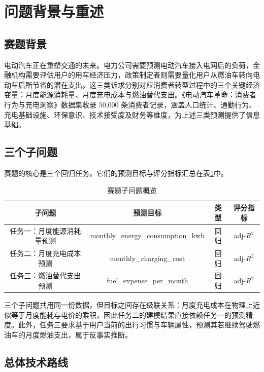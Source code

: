 \section{问题背景与重述}

\subsection{赛题背景}

电动汽车正在重塑交通的未来。电力公司需要预测电动汽车接入电网后的负荷，金融机构需要评估用户的用车经济压力，政策制定者则需要量化用户从燃油车转向电动车后所节省的潜在支出。这三类诉求分别对应消费者转型过程中的三个关键经济变量：月度能源消耗量、月度充电成本与燃油替代支出。《电动汽车革命：消费者行为与充电洞察》数据集收录 50,000 条消费者记录，涵盖人口统计、通勤行为、充电基础设施、环保意识、技术接受度及财务等维度，为上述三类预测提供了信息基础。

\subsection{三个子问题}

赛题的核心是三个回归任务。它们的预测目标与评分指标汇总在表\ref{tab:tasks}中。

\begin{table}[H]
\centering
\caption{赛题子问题概览}
\label{tab:tasks}
\begin{tabular}{cccc}
\toprule
\textbf{子问题} & \textbf{预测目标} & \textbf{类型} & \textbf{评分指标} \\
\midrule
任务一：月度能源消耗量预测 & monthly\_energy\_consumption\_kwh & 回归 & adj-$R^2$ \\
任务二：月度充电成本预测 & monthly\_charging\_cost & 回归 & adj-$R^2$ \\
任务三：燃油替代支出预测 & fuel\_expense\_per\_month & 回归 & adj-$R^2$ \\
\bottomrule
\end{tabular}
\end{table}

三个子问题共用同一份数据，但目标之间存在级联关系：月度充电成本在物理上近似等于月度能耗与电价的乘积，因此任务二的建模结果直接依赖任务一的预测精度。此外，任务三要求基于用户当前的出行习惯与车辆属性，预测其若继续驾驶燃油车的月度燃油支出，属于反事实推断。

\subsection{总体技术路线}

